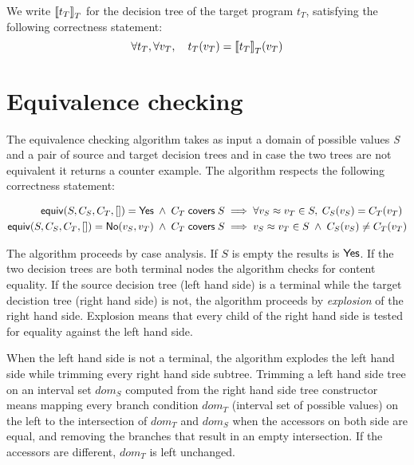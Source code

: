 \documentclass[12pt]{article}
\begin{document}
We write ${\llbracket{t_T}\rrbracket}_T$ for the decision tree of the target program
$t_T$, satisfying the following correctness statement:
\[
\forall t_T, \forall v_T, \quad t_T(v_T) = {\llbracket{t_T}\rrbracket}_T(v_T)
\]

\section{Equivalence checking}
The equivalence checking algorithm takes as input a domain of
possible values \emph{S} and a pair of source and target decision trees and
in case the two trees are not equivalent it returns a counter example.
The algorithm respects the following correctness statement:


\begin{align*}
 \mathsf{equiv}(S, C_S, C_T, \mathord{[]}) = \mathsf{Yes} \;\land\; C_T \mathrel{\mathsf{covers}} S
 & \implies
 \forall v_S \approx v_T \in S,\; C_S(v_S) = C_T(v_T)
\\
 \mathsf{equiv}(S, C_S, C_T, \mathord{[]}) = \mathsf{No}(v_S, v_T) \;\land\; C_T \mathrel{\mathsf{covers}} S
 & \implies
 v_S \approx v_T \in S \;\land\; C_S(v_S) \neq C_T(v_T)
\end{align*}


The algorithm proceeds by case analysis.
If $S$ is empty the results is $\mathsf{Yes}$.
If the two decision trees are both terminal nodes the algorithm checks
for content equality.
If the source decision tree (left hand side) is a terminal while the
target decistion tree (right hand side) is not, the algorithm proceeds
by \emph{explosion} of the right hand side. Explosion means that every
child of the right hand side is tested for equality against the left
hand side.


When the left hand side is not a terminal, the algorithm explodes the
left hand side while trimming every right hand side subtree. Trimming
a left hand side tree on an interval set $dom_S$ computed from the right hand
side tree constructor means mapping every branch condition $dom_T$ (interval set of
possible values) on the left to the intersection of $dom_T$ and $dom_S$ when
the accessors on both side are equal, and removing the branches that
result in an empty intersection. If the accessors are different,
\emph{$dom_T$} is left unchanged.
\end{document}
